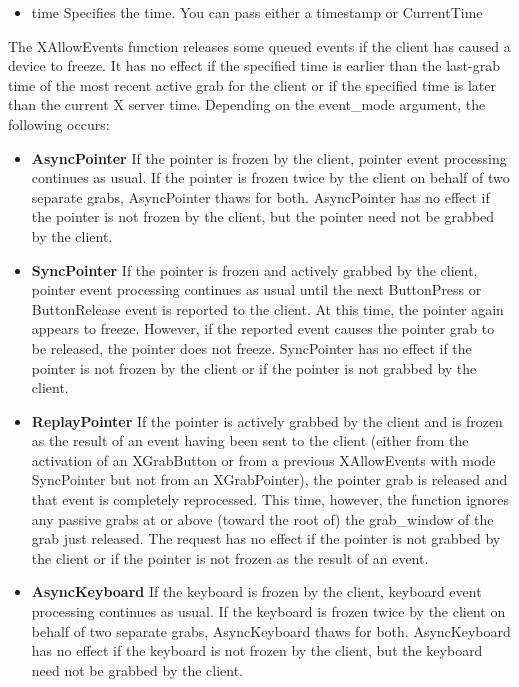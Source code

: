 \documentclass{report}
\begin{document}
\begin{itemize}
\begin{itemize}
                \item time Specifies the time. You can pass either a timestamp or CurrentTime
            \end{itemize}
            The XAllowEvents function releases some queued events if the client has caused a device to freeze. It has no effect if the specified time is earlier than the last-grab time of the most recent active grab for the client or if the specified time is later than the current X server time. Depending on the event\_mode argument, the following occurs:
            \begin{itemize}
                \item \textbf{AsyncPointer} If the pointer is frozen by the client, pointer event processing continues as usual. If the pointer is frozen twice by the client on behalf of two separate grabs, AsyncPointer thaws for both. AsyncPointer has no effect if the pointer is not frozen by the client, but the pointer need not be grabbed by the client.
                \item \textbf{SyncPointer} If the pointer is frozen and actively grabbed by the client, pointer event processing continues as usual until the next ButtonPress or ButtonRelease event is reported to the client. At this time, the pointer again appears to freeze. However, if the reported event causes the pointer grab to be released, the pointer does not freeze. SyncPointer has no effect if the pointer is not frozen by the client or if the pointer is not grabbed by the client.
                \item \textbf{ReplayPointer} If the pointer is actively grabbed by the client and is frozen as the result of an event having been sent to the client (either from the activation of an XGrabButton or from a previous XAllowEvents with mode SyncPointer but not from an XGrabPointer), the pointer grab is released and that event is completely reprocessed. This time, however, the function ignores any passive grabs at or above (toward the root of) the grab\_window of the grab just released. The request has no effect if the pointer is not grabbed by the client or if the pointer is not frozen as the result of an event.
                \item \textbf{AsyncKeyboard} If the keyboard is frozen by the client, keyboard event processing continues as usual. If the keyboard is frozen twice by the client on behalf of two separate grabs, AsyncKeyboard thaws for both. AsyncKeyboard has no effect if the keyboard is not frozen by the client, but the keyboard need not be grabbed by the client.

\end{itemize}
\end{itemize}
\end{document}

